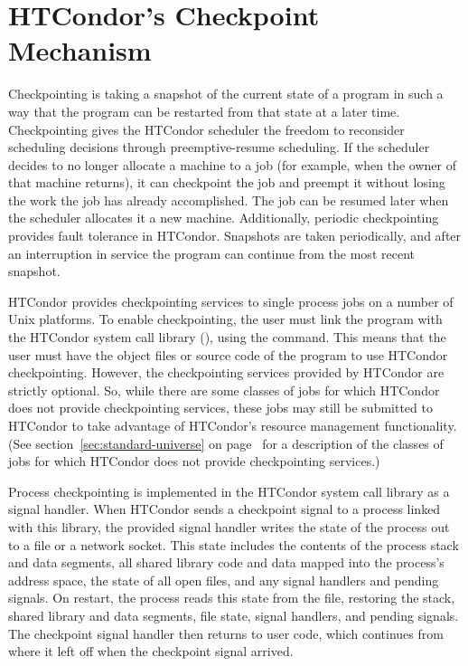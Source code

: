 \section{\label{ckpt-reference}
HTCondor's Checkpoint Mechanism}

Checkpointing is taking a snapshot of the current state of a program
in such a way that the program can be restarted from that state at a
later time.  Checkpointing gives the HTCondor scheduler the freedom to
reconsider scheduling decisions through preemptive-resume scheduling.
If the scheduler decides to no longer allocate a machine to a job (for
example, when the owner of that machine returns), it can checkpoint
the job and preempt it without losing the work the job has already
accomplished.  The job can be resumed later when the scheduler
allocates it a new machine.  Additionally, periodic checkpointing
provides fault tolerance in HTCondor.  Snapshots are taken periodically,
and after an interruption in service the program can continue from the
most recent snapshot.

HTCondor provides checkpointing services to single process jobs on a
number of Unix platforms.
To enable checkpointing, the user must link the program with the
HTCondor system call library (), using the
 command.
This means that the
user must have the object files or source code of the program to use
HTCondor checkpointing.  However, the checkpointing services provided by
HTCondor are strictly optional.  So, while there are some classes of
jobs for which HTCondor does not provide checkpointing services, these
jobs may still be submitted to HTCondor to take advantage of HTCondor's
resource management functionality.  (See
section~\ref{sec:standard-universe} on
page~\pageref{sec:standard-universe} for a description of the
classes of jobs for which HTCondor does not provide checkpointing
services.)

Process checkpointing is implemented in the HTCondor system call library
as a signal handler.  When HTCondor sends a checkpoint signal to a
process linked with this library, the provided signal handler writes
the state of the process out to a file or a network socket.  This
state includes the contents of the process stack and data segments,
all shared library code and data mapped into the process's address
space, the state of all open files, and any signal handlers and
pending signals.  On restart, the process reads this state from the
file, restoring the stack, shared library and data segments, file
state, signal handlers, and pending signals.  The checkpoint signal
handler then returns to user code, which continues from where it left
off when the checkpoint signal arrived.

